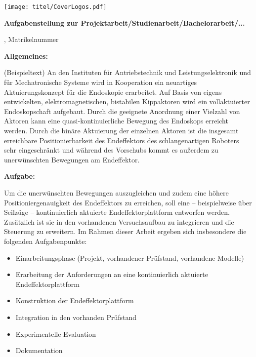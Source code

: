 \newpage
{}
     \begin{flushright}
          \vspace*{-20mm}
          \texttt{[image: titel/CoverLogos.pdf]}
     \end{flushright}
\vspace*{10mm} %
{\let\clearpage\relax}\thispagestyle{empty}

\begin{spacing}{1}        
\begin{center}
\large\textbf{Aufgabenstellung zur Projektarbeit/Studienarbeit/Bachelorarbeit/...}

\normalsize \Autor, Matrikelnummer \Matrikelnummer

\end{center}

\textbf{Allgemeines:}

(Beispieltext) An den Instituten für Antriebstechnik und Leistungselektronik und für Mechatronische Systeme wird in Kooperation ein neuartiges Aktuierungskonzept für die Endoskopie erarbeitet. Auf Basis von eigens entwickelten, elektromagnetischen, bistabilen Kippaktoren wird ein vollaktuierter Endoskopschaft aufgebaut. Durch die geeignete Anordnung einer Vielzahl von Aktoren kann eine quasi-kontinuierliche Bewegung des Endoskops erreicht werden. Durch die binäre Aktuierung der einzelnen Aktoren ist die insgesamt erreichbare Positionierbarkeit des Endeffektors des schlangenartigen Roboters sehr eingeschränkt und während des Vorschubs kommt es außerdem zu unerwünschten Bewegungen am Endeffektor.

\bigskip\textbf{Aufgabe:}

Um die unerwünschten Bewegungen auszugleichen und zudem eine höhere Positioniergenauigkeit des Endeffektors zu erreichen, soll eine -- beispielweise über Seilzüge -- kontinuierlich aktuierte Endeffektorplattform entworfen werden. Zusätzlich ist sie in den vorhandenen Versuchsaufbau zu integrieren und die Steuerung zu erweitern. Im Rahmen dieser Arbeit ergeben sich insbesondere die folgenden Aufgabenpunkte:

\begin{itemize}
	\item{Einarbeitungsphase (Projekt, vorhandener Prüfstand, vorhandene Modelle)}
	\item{Erarbeitung der Anforderungen an eine kontinuierlich aktuierte Endeffektorplattform}
	\item{Konstruktion der Endeffektorplattform}
	\item{Integration in den vorhanden Prüfstand}
	\item{Experimentelle Evaluation}
	\item{Dokumentation}
\end{itemize}


\end{spacing}
